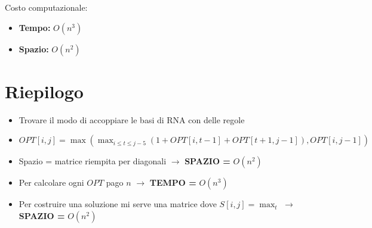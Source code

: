 Costo computazionale:
\begin{itemize}
  \item \textbf{Tempo:} $O(n^3)$
  \item \textbf{Spazio:} $O(n^2)$
\end{itemize}

\section{Riepilogo}

\begin{itemize}
  \item
        Trovare il modo di accoppiare le basi di RNA con delle regole
  \item
        $OPT[i,j] = \max(\max_{i \le t \le j-5}(1 + OPT[i, t-1] + OPT[t+1, j-1]), OPT[i, j-1])$
  \item
        Spazio = matrice riempita per diagonali $\rightarrow$ \textbf{SPAZIO
          =} $O(n^2)$
  \item
        Per calcolare ogni $OPT$ pago $n$ $\rightarrow$ \textbf{TEMPO =}
        $O(n^3)$
  \item
        Per costruire una soluzione mi serve una matrice dove
        $S[i,j] = \max_t$ $\rightarrow$ \textbf{SPAZIO =} $O(n^2)$
\end{itemize}
